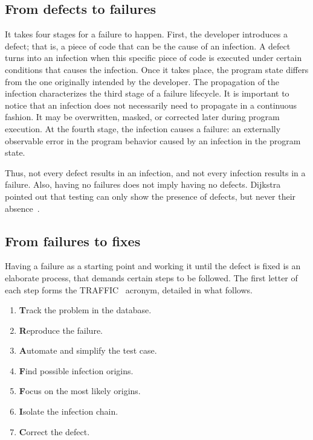 \subsection{From defects to failures}\label{subsec:def-failure}

It takes four stages for a failure to happen. First, the developer introduces a
defect; that is,  a piece of code that can be the cause of an infection.
A defect turns into an infection when this specific piece of code is executed
under certain conditions that causes the infection. Once it takes place, the
program state differs from the one originally intended by the developer.
The propagation of the infection characterizes the third stage of a failure
lifecycle.
It is important to notice that an infection does not necessarily need to
propagate in a continuous fashion. It may be overwritten, masked, or corrected
later during program execution.
At the fourth stage, the infection causes a failure: an externally observable
error in the program behavior caused by an infection in the program state.

Thus, not every defect results in an infection, and not every infection results
in a failure. Also, having no failures does not imply having no defects.
Dijkstra pointed out that testing can only show the presence of defects, but
never their absence~\cite[p. 66]{buxton1970software}.

\subsection{From failures to fixes}

Having a failure as a starting point and working it until the defect is fixed is
an elaborate process, that demands certain steps to be followed. The first
letter of each step forms the TRAFFIC~\cite{zeller2009programs} acronym,
detailed in what follows.

\begin{enumerate}
  \item \textbf{T}rack the problem in the database.\label{list-1-traffic-track}
  \item \textbf{R}eproduce the failure.
  \item \textbf{A}utomate and simplify the test case.
  \item \textbf{F}ind possible infection origins.
  \item \textbf{F}ocus on the most likely origins.
  \item \textbf{I}solate the infection chain.
  \item \textbf{C}orrect the defect.
\end{enumerate}

